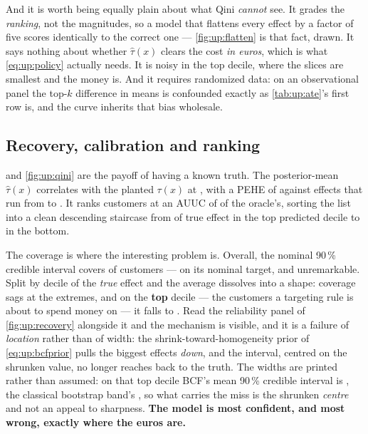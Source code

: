 And it is worth being equally plain about what Qini \emph{cannot} see. It grades the
\emph{ranking}, not the magnitudes, so a model that flattens every effect by a factor of five
scores identically to the correct one --- \cref{fig:up:flatten} is that fact, drawn. It says
nothing about whether $\hat\tau(x)$ clears the cost \emph{in euros}, which is what
\cref{eq:up:policy} actually needs. It is noisy in the top decile, where the slices are smallest
and the money is. And it requires randomized data: on an observational panel the top-$k$
difference in means is confounded exactly as \cref{tab:up:ate}'s first row is, and the curve
inherits that bias wholesale.

\subsection*{Recovery, calibration and ranking}

 and \cref{fig:up:qini} are the payoff of having a known truth. The
posterior-mean $\hat\tau(x)$ correlates with the planted $\tau(x)$ at \nbOneBcfCorr, with a PEHE
of \eur{\nbOneBcfPehe} against effects that run from \eur{\nbOneTauLo} to \eur{\nbOneTauHi}. It
ranks customers at an AUUC of \nbOneBcfAuuc{} of the oracle's, sorting the list into a clean
descending staircase from \eur{\nbOneDecTopTrue} of true effect in the top predicted decile to
\eur{\nbOneDecBotTrue} in the bottom.

The coverage is where the interesting problem is. Overall, the nominal 90\,\% credible interval
covers \pc{\nbOneBcfCovNinety} of customers --- on its nominal target, and unremarkable. Split by
decile of the \emph{true} effect and the average dissolves into a shape: coverage sags at the
extremes, and on the \textbf{top} decile --- the customers a targeting rule is about to spend
money on --- it falls to \pc{\nbOneBcfTopDec}. Read the reliability panel of \cref{fig:up:recovery}
alongside it and the mechanism is visible, and it is a failure of \emph{location} rather than of
width: the shrink-toward-homogeneity prior of \cref{eq:up:bcfprior} pulls the biggest effects
\emph{down}, and the interval, centred on the shrunken value, no longer reaches back to the truth.
The widths are printed rather than assumed: on that top decile BCF's mean 90\,\% credible interval
is \eur{\nbOneBcfTopdecWidth}, \nbOneTopdecWidthVerdict{} the classical bootstrap band's
\eur{\nbOneBootTopdecWidth}, so what carries the miss is the shrunken \emph{centre} and not an
appeal to sharpness. \textbf{The model is most confident, and most wrong, exactly where the euros
are.}


